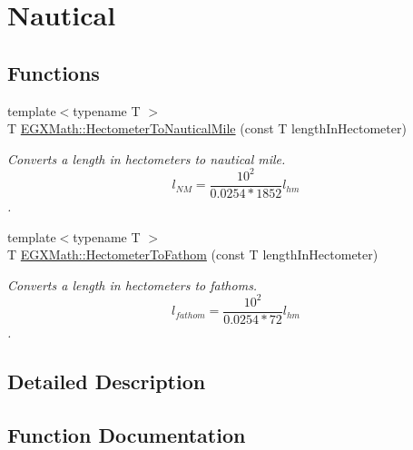 \hypertarget{group___e_g_x_math-_conversions-_length_conversions-_hectometer-_nautical}{}\section{Nautical}
\label{group___e_g_x_math-_conversions-_length_conversions-_hectometer-_nautical}
\subsection*{Functions}
\begin{DoxyCompactItemize}
\item 
{\footnotesize template$<$typename T $>$ }\\T \mbox{\hyperlink{group___e_g_x_math-_conversions-_length_conversions-_hectometer-_nautical_ga74e84be72b4e2272d547b5d7e21211dc}{E\+G\+X\+Math\+::\+Hectometer\+To\+Nautical\+Mile}} (const T length\+In\+Hectometer)
\begin{DoxyCompactList}\small\item\em Converts a length in hectometers to nautical mile. \[ l_{NM}= \frac{10^{2}}{0.0254 * 1852} l_{hm} \]. \end{DoxyCompactList}\item 
{\footnotesize template$<$typename T $>$ }\\T \mbox{\hyperlink{group___e_g_x_math-_conversions-_length_conversions-_hectometer-_nautical_ga487d637d16d2468a9969ab3a4f50eeb1}{E\+G\+X\+Math\+::\+Hectometer\+To\+Fathom}} (const T length\+In\+Hectometer)
\begin{DoxyCompactList}\small\item\em Converts a length in hectometers to fathoms. \[ l_{fathom}= \frac{10^{2}}{0.0254 * 72} l_{hm} \]. \end{DoxyCompactList}\end{DoxyCompactItemize}


\subsection{Detailed Description}


\subsection{Function Documentation}
\mbox{\label{group___e_g_x_math-_conversions-_length_conversions-_hectometer-_nautical_ga487d637d16d2468a9969ab3a4f50eeb1}} 
